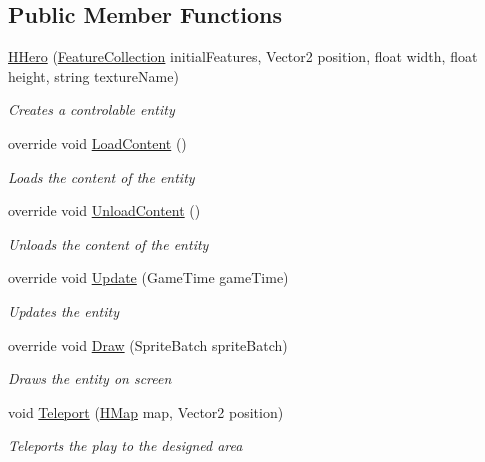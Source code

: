 \subsection*{Public Member Functions}
\begin{DoxyCompactItemize}
\item 
\hyperlink{class_hel_project_1_1_game_world_1_1_entities_1_1_h_hero_a25d719007efc211da7bde1dcf1425b43}{H\+Hero} (\hyperlink{class_hel_project_1_1_features_1_1_feature_collection}{Feature\+Collection} initial\+Features, Vector2 position, float width, float height, string texture\+Name)
\begin{DoxyCompactList}\small\item\em Creates a controlable entity \end{DoxyCompactList}\item 
override void \hyperlink{class_hel_project_1_1_game_world_1_1_entities_1_1_h_hero_a8b69c5d3b4e7c68b2472de1d3bf76618}{Load\+Content} ()
\begin{DoxyCompactList}\small\item\em Loads the content of the entity \end{DoxyCompactList}\item 
override void \hyperlink{class_hel_project_1_1_game_world_1_1_entities_1_1_h_hero_a2e665a9cc2a0fea82c4ac7c8b1f3468b}{Unload\+Content} ()
\begin{DoxyCompactList}\small\item\em Unloads the content of the entity \end{DoxyCompactList}\item 
override void \hyperlink{class_hel_project_1_1_game_world_1_1_entities_1_1_h_hero_a421c030a8fde6fe6707b5416d0db46ff}{Update} (Game\+Time game\+Time)
\begin{DoxyCompactList}\small\item\em Updates the entity \end{DoxyCompactList}\item 
override void \hyperlink{class_hel_project_1_1_game_world_1_1_entities_1_1_h_hero_a8a08422c569dbff045d597aa1663c338}{Draw} (Sprite\+Batch sprite\+Batch)
\begin{DoxyCompactList}\small\item\em Draws the entity on screen \end{DoxyCompactList}\item 
void \hyperlink{class_hel_project_1_1_game_world_1_1_entities_1_1_h_hero_a08af2c870a3d5509e7eb46d8199da757}{Teleport} (\hyperlink{class_hel_project_1_1_game_world_1_1_map_1_1_h_map}{H\+Map} map, Vector2 position)
\begin{DoxyCompactList}\small\item\em Teleports the play to the designed area \end{DoxyCompactList}\end{DoxyCompactItemize}
